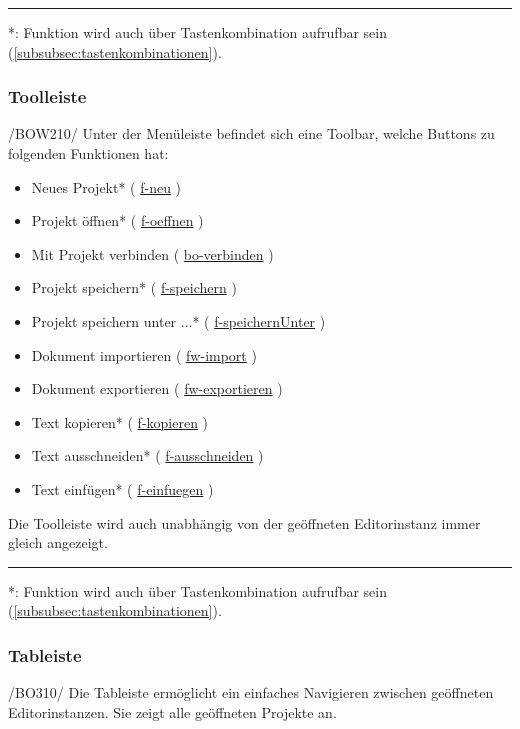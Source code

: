\documentclass{scrartcl}
\newcommand{\refFunction}[1]{%
  \hyperlink{#1}{\csname #1\endcsname}%
  }
\begin{document}
\noindent\rule{\textwidth}{1pt}
*: Funktion wird auch über Tastenkombination aufrufbar sein (\ref{subsubsec:tastenkombinationen}).


\newpage
\subsubsection{Toolleiste}
\label{subsubsec:toolbar}

/BOW210/ Unter der Menüleiste befindet sich eine Toolbar, welche Buttons zu folgenden Funktionen hat:

\begin{itemize}
\item Neues Projekt* (\refFunction{f-neu})
\item Projekt öffnen* (\refFunction{f-oeffnen})
\item Mit Projekt verbinden (\refFunction{bo-verbinden})
\item Projekt speichern* (\refFunction{f-speichern})
\item Projekt speichern unter ...* (\refFunction{f-speichernUnter})
\item Dokument importieren (\refFunction{fw-import})
\item Dokument exportieren (\refFunction{fw-exportieren})
\item Text kopieren* (\refFunction{f-kopieren})
\item Text ausschneiden* (\refFunction{f-ausschneiden})
\item Text einfügen* (\refFunction{f-einfuegen})
\end{itemize}

Die Toolleiste wird auch unabhängig von der geöffneten Editorinstanz immer gleich angezeigt.

\noindent\rule{\textwidth}{1pt}
*: Funktion wird auch über Tastenkombination aufrufbar sein (\ref{subsubsec:tastenkombinationen}).

\subsubsection{Tableiste}
\label{subsubsec:tableiste}
/BO310/ Die Tableiste ermöglicht ein einfaches Navigieren zwischen geöffneten Editorinstanzen. Sie zeigt alle geöffneten Projekte an.
\end{document}
